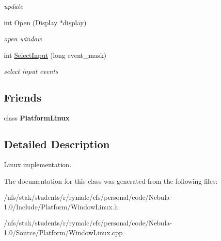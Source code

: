 \begin{DoxyCompactItemize}
\begin{DoxyCompactList}\small\item\em update \item\end{DoxyCompactList}\item 
\hypertarget{classPlatform_1_1WindowLinux_acc4914681f23c162030a37edac2b9361}{
int \hyperlink{classPlatform_1_1WindowLinux_acc4914681f23c162030a37edac2b9361}{Open} (Display $\ast$display)}
\label{classPlatform_1_1WindowLinux_acc4914681f23c162030a37edac2b9361}

\begin{DoxyCompactList}\small\item\em open window \item\end{DoxyCompactList}\item 
\hypertarget{classPlatform_1_1WindowLinux_a4fd6cd64fe01d9033f108a3abe524243}{
int \hyperlink{classPlatform_1_1WindowLinux_a4fd6cd64fe01d9033f108a3abe524243}{SelectInput} (long event\_\-mask)}
\label{classPlatform_1_1WindowLinux_a4fd6cd64fe01d9033f108a3abe524243}

\begin{DoxyCompactList}\small\item\em select input events \item\end{DoxyCompactList}\end{DoxyCompactItemize}
\subsection*{Friends}
\begin{DoxyCompactItemize}
\item 
\hypertarget{classPlatform_1_1WindowLinux_a6bbf5ffcc87fc587e02e1014e92fab79}{
class {\bfseries PlatformLinux}}
\label{classPlatform_1_1WindowLinux_a6bbf5ffcc87fc587e02e1014e92fab79}

\end{DoxyCompactItemize}


\subsection{Detailed Description}
Linux implementation. 

The documentation for this class was generated from the following files:\begin{DoxyCompactItemize}
\item 
/nfs/stak/students/r/rymalc/cfs/personal/code/Nebula-\/1.0/Include/Platform/WindowLinux.h\item 
/nfs/stak/students/r/rymalc/cfs/personal/code/Nebula-\/1.0/Source/Platform/WindowLinux.cpp\end{DoxyCompactItemize}
